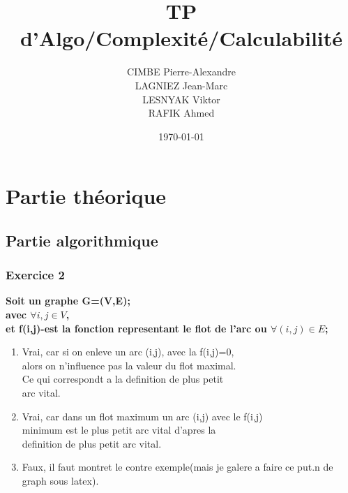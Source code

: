 \documentclass[]{article}
\title{TP d'Algo/Complexité/Calculabilité}
\author{
  CIMBE Pierre-Alexandre \\
  LAGNIEZ Jean-Marc \\
  LESNYAK Viktor \\
  RAFIK Ahmed}
\date\today
\begin{document}
\maketitle

\section{Partie théorique}
\subsection{Partie algorithmique}

\subsubsection{Exercice 2}

\textbf{Soit un graphe G=(V,E);\\avec $\forall i,j \in V$,\\
et f(i,j)-est la fonction representant le flot de l'arc ou $\forall (i,j)\in E$;\\}

\begin{enumerate}


\item Vrai, car si on enleve un arc (i,j), avec la f(i,j)=0,\\ alors on n'influence pas la valeur du flot maximal.\\
Ce qui correspondt a la definition de plus petit \\arc vital.

\item Vrai, car dans un flot maximum un arc (i,j) avec le f(i,j)\\ minimum est le plus petit arc vital d'apres la \\
definition de plus petit arc vital.
\item Faux, il faut montret le contre exemple(mais je galere a faire ce put.n de graph sous latex).


\usetikzlibrary{arrows}
\thispagestyle{empty}
\begin{center}
\end{center}
 
\end{enumerate} 
\end{document}
